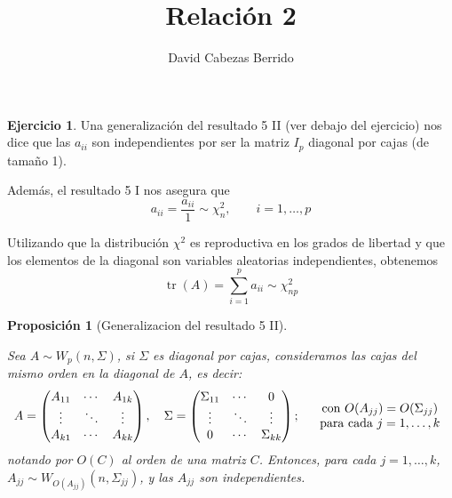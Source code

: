\documentclass[12pt,spanish]{article}
\title{Relación 2}
\author{David Cabezas Berrido}
\date{}
\newtheorem*{proposition}{Proposici\'on}
\theoremstyle{definition}
\newtheorem{exercise}{Ejercicio}
\begin{document}
\maketitle

\begin{exercise} %
  Una generalización del resultado 5 II (ver debajo del ejercicio) nos
  dice que las $a_{ii}$ son independientes por ser la matriz $I_p$
  diagonal por cajas (de tamaño 1).

  Además, el resultado 5 I nos asegura
  que \[a_{ii}=\frac{a_{ii}}{1}\sim \chi^2_n,\qquad i=1,\ldots,p\]
  
  Utilizando que la distribución $\chi^2$ es reproductiva en los
  grados de libertad y que los elementos de la diagonal son variables
  aleatorias independientes, obtenemos
  \[\operatorname{tr}(A)=\sum_{i=1}^pa_{ii}\sim \chi^2_{np}\]
\end{exercise}

\begin{proposition}[Generalizacion del resultado 5 II] \label{generalizacion-5II}

  Sea $A\sim W_p(n,\Sigma)$, si $\Sigma$ es diagonal por cajas,
  consideramos las cajas del mismo orden en la diagonal de $A$, es
  decir: \[A=
  \begin{pmatrix}
    A_{11} & \cdots & A_{1k} \\ \vdots & \ddots & \vdots \\ A_{k1} & \cdots & A_{kk}
  \end{pmatrix},\quad \Sigma=\begin{pmatrix}
    \Sigma_{11} & \cdots & 0 \\ \vdots & \ddots & \vdots \\ 0 & \cdots & \Sigma_{kk}
  \end{pmatrix}; \quad \begin{tabular}{c} \text{con $O(A_{jj})=O(\Sigma_{jj})$} \\ \text{para cada $j=1,\ldots,k$}\end{tabular}\]
notando por $O(C)$ al orden de una matriz $C$. Entonces, para cada
$j=1,\ldots,k$, \\ $A_{jj}\sim W_{O(A_{jj})}(n,\Sigma_{jj})$, y las $A_{jj}$ son independientes.
\end{proposition}
\end{document}
